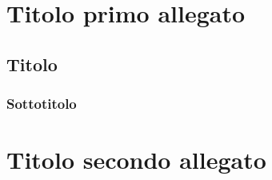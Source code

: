 \chapter{Titolo primo allegato}

\section{Titolo}

\subsection{Sottotitolo}

\chapter{Titolo secondo allegato}

